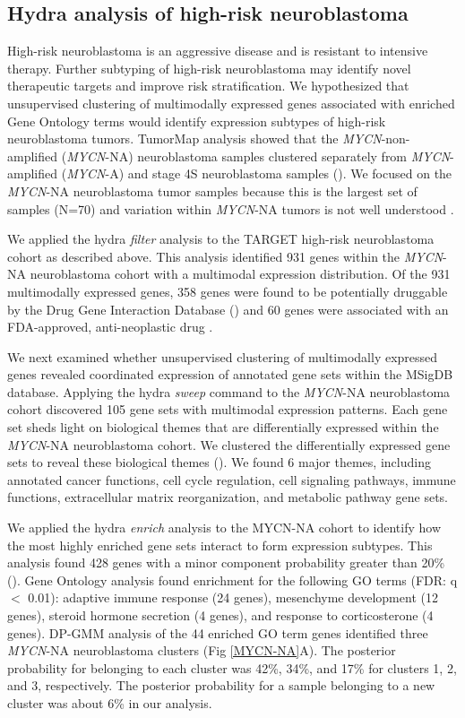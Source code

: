 \documentclass[10pt,letterpaper]{article}
\begin{document}
\subsection*{Hydra analysis of high-risk neuroblastoma}
High-risk neuroblastoma is an aggressive disease and is resistant to intensive therapy. Further subtyping of high-risk neuroblastoma may identify novel therapeutic targets and improve risk stratification. We hypothesized that unsupervised clustering of multimodally expressed genes associated with enriched Gene Ontology terms would identify expression subtypes of high-risk neuroblastoma tumors. TumorMap  analysis \cite{newtonTumorMapExploringMolecular2017} showed that the \textit{MYCN}-non-amplified (\textit{MYCN}-NA) neuroblastoma samples clustered separately from \textit{MYCN}-amplified (\textit{MYCN}-A) and stage 4S neuroblastoma samples (). We focused on the \textit{MYCN}-NA neuroblastoma tumor samples because this is the largest set of samples (N=70) and variation within \textit{MYCN}-NA tumors is not well understood \cite{morgensternChallengeDefiningUltrahighrisk2019}.

We applied the hydra \textit{filter} analysis to the TARGET high-risk neuroblastoma cohort as described above. This analysis identified 931 genes within the \textit{MYCN}-NA neuroblastoma cohort with a multimodal expression distribution. Of the 931 multimodally expressed genes, 358 genes were found to be potentially druggable by the Drug Gene Interaction Database () and 60 genes were associated with an FDA-approved, anti-neoplastic drug \cite{cotto2017dgidb}.

We next examined whether unsupervised clustering of multimodally expressed genes revealed coordinated expression of annotated gene sets within the MSigDB database. Applying the hydra \textit{sweep} command to the \textit{MYCN}-NA neuroblastoma cohort discovered 105 gene sets with multimodal expression patterns. Each gene set sheds light on biological themes that are differentially expressed within the \textit{MYCN}-NA neuroblastoma cohort. We clustered the differentially expressed gene sets to reveal these biological themes (). We found 6 major themes, including annotated cancer functions, cell cycle regulation, cell signaling pathways, immune functions, extracellular matrix reorganization, and metabolic pathway gene sets.

We applied the hydra \textit{enrich} analysis to the MYCN-NA cohort to identify how the most highly enriched gene sets interact to form expression subtypes. This analysis found 428 genes with a minor component probability greater than 20\% (). Gene Ontology analysis found enrichment for the following GO terms (FDR: q $<$ 0.01): adaptive immune response (24 genes), mesenchyme development (12 genes), steroid hormone secretion (4 genes), and response to corticosterone (4 genes). DP-GMM analysis of the 44 enriched GO term genes identified three \textit{MYCN}-NA neuroblastoma clusters (Fig \ref{MYCN-NA}A). The posterior probability for belonging to each cluster was 42\%, 34\%, and 17\% for clusters 1, 2, and 3, respectively. The posterior probability for a sample belonging to a new cluster was about 6\% in our analysis.
\end{document}
